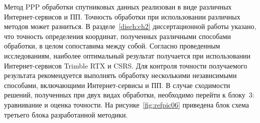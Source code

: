 Метод PPP обработки спутниковых данных реализован в виде различных Интернет-сервисов и ПП. Точность обработки при использовании различных методов может разниться. В разделе~\cref*{disch:ch2} диссертационной работы указано, что точность определения координат, полученных различными способами обработки, в целом сопоставима между собой. Согласно проведенным исследованиям, наиболее оптимальный результат получается при использовании Интернет-сервисов Trimble RTX и CSRS. 
Для контроля точности получаемого результата рекомендуется выполнять обработку несколькими независимыми способами, включающими Интернет-сервисы и ПП.
В случае сходимости решений, полученных при двух видах обработки, необходимо перейти к блоку~$3$: уравнивание и оценка точности. На рисунке~\cref{fig:refpic06} приведена блок схема третьего блока разработанной методики.


